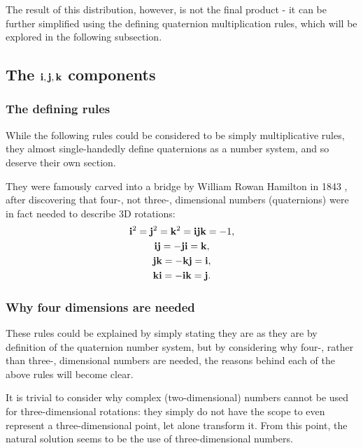 \documentclass[10pt]{article}
\begin{document}
The result of this distribution, however, is not the final product - it can be further simplified using the defining quaternion multiplication rules, which will be explored in the following subsection.

\subsection{The $\vb{i, j, k}$ components} \label{ijkComponentsSection}

\subsubsection{The defining rules}

While the following rules \cite{Eater} could be considered to be simply multiplicative rules, they almost single-handedly define quaternions as a number system, and so deserve their own section.

They were famously carved into a bridge by William Rowan Hamilton in 1843 \cite{QuaternionWiki}, after discovering that four-, not three-, dimensional numbers (quaternions) were in fact needed to describe 3D rotations:
\begin{subequations} \label{MultProperties1}
    \begin{gather}
        \vb{i}^2 = \vb{j}^2 = \vb{k}^2 = \vb{i}\vb{j}\vb{k} = -1, \\
        \vb{ij} = -\vb{ji} = \vb{k}, \\
        \vb{jk} = -\vb{kj} = \vb{i}, \\
        \vb{ki} = -\vb{ik} = \vb{j}.
    \end{gather}
\end{subequations}

\subsubsection{Why four dimensions are needed}

These rules could be explained by simply stating they are as they are by definition of the quaternion number system, but by considering why four-, rather than three-, dimensional numbers are needed, the reasons behind each of the above rules will become clear.

It is trivial to consider why complex (two-dimensional) numbers cannot be used for three-dimensional rotations: they simply do not have the scope to even represent a three-dimensional point, let alone transform it. From this point, the natural solution seems to be the use of three-dimensional numbers.
\end{document}
